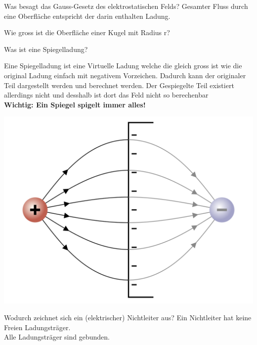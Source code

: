 \begin{lk}{Was besagt das Gauss-Gesetz des elektrostatischen Felds?}
	Gesamter Fluss durch eine Oberfläche entspricht der darin enthalten Ladung.
\end{lk}

\begin{lk}{Wie gross ist die Oberfläche einer Kugel mit Radius r?}
\end{lk}


\begin{lk}{Was ist eine Spiegelladung?}
	\begin{minipage}{0.7\textwidth}
		Eine Spiegelladung ist eine Virtuelle Ladung welche die gleich gross ist wie die original Ladung einfach mit negativem Vorzeichen. Dadurch kann der originaler Teil dargestellt werden und berechnet werden. Der Gespiegelte Teil existiert allerdings nicht und desshalb ist dort das Feld nicht so berechenbar\\
		\textbf{Wichtig: Ein Spiegel spigelt immer alles!}
	\end{minipage}
	\begin{minipage}{0.29\textwidth}
			\includegraphics[width=\textwidth]{pics/ES_Spiegelladung.png}
	\end{minipage}
\end{lk}

\begin{lk}{Wodurch zeichnet sich ein (elektrischer) Nichtleiter aus?}
	Ein Nichtleiter hat keine Freien Ladungsträger.\\
	Alle Ladungsträger sind gebunden.
\end{lk}

